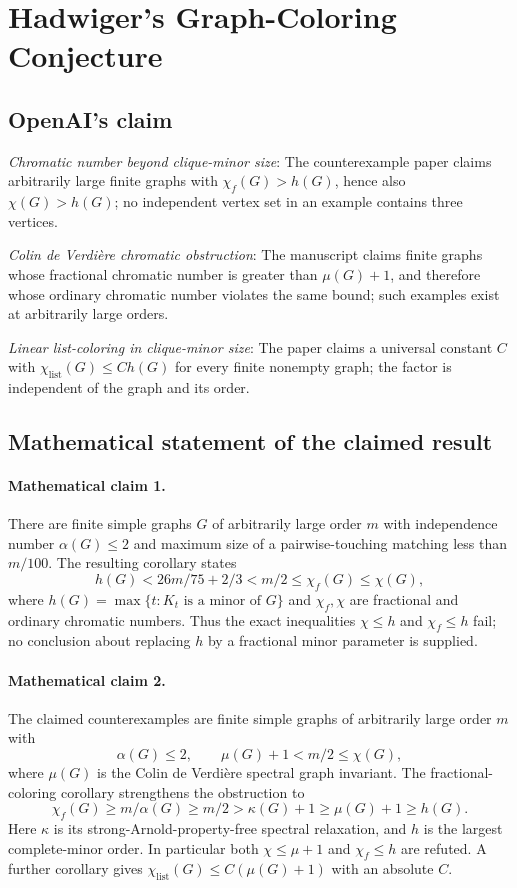 \documentclass[11pt]{article}
\begin{document}
\section*{Hadwiger’s Graph-Coloring Conjecture}

\subsection{OpenAI's claim}
\textit{Chromatic number beyond clique-minor size}: The counterexample paper claims arbitrarily large finite graphs with $\chi_f(G)>h(G)$, hence also $\chi(G)>h(G)$; no independent vertex set in an example contains three vertices.

\textit{Colin de Verdière chromatic obstruction}: The manuscript claims finite graphs whose fractional chromatic number is greater than $\mu(G)+1$, and therefore whose ordinary chromatic number violates the same bound; such examples exist at arbitrarily large orders.

\textit{Linear list-coloring in clique-minor size}: The paper claims a universal constant $C$ with $\chi_{\mathrm{list}}(G)\le C h(G)$ for every finite nonempty graph; the factor is independent of the graph and its order.

\subsection{Mathematical statement of the claimed result}
\paragraph{Mathematical claim 1.} There are finite simple graphs $G$ of arbitrarily large order $m$ with independence number $\alpha(G)\le2$ and maximum size of a pairwise-touching matching less than $m/100$. The resulting corollary states \[h(G)<26m/75+2/3<m/2\le\chi_f(G)\le\chi(G),\] where $h(G)=\max\{t:K_t\text{ is a minor of }G\}$ and $\chi_f,\chi$ are fractional and ordinary chromatic numbers. Thus the exact inequalities $\chi\le h$ and $\chi_f\le h$ fail; no conclusion about replacing $h$ by a fractional minor parameter is supplied.

\paragraph{Mathematical claim 2.} The claimed counterexamples are finite simple graphs of arbitrarily large order $m$ with \[\alpha(G)\le2,\qquad\mu(G)+1<m/2\le\chi(G),\] where $\mu(G)$ is the Colin de Verdi\`ere spectral graph invariant. The fractional-coloring corollary strengthens the obstruction to \[\chi_f(G)\ge m/\alpha(G)\ge m/2>\kappa(G)+1\ge\mu(G)+1\ge h(G).\] Here $\kappa$ is its strong-Arnold-property-free spectral relaxation, and $h$ is the largest complete-minor order. In particular both $\chi\le\mu+1$ and $\chi_f\le h$ are refuted. A further corollary gives $\chi_{\mathrm{list}}(G)\le C(\mu(G)+1)$ with an absolute $C$.
\end{document}
